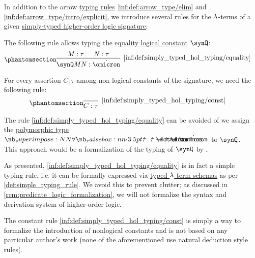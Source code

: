 \begin{definition}\label{def:simply_typed_hol_typing}\mimprovised
  In addition to the arrow \hyperref[con:typing_rule]{typing rules} \ref{inf:def:arrow_type/elim} and \ref{inf:def:arrow_type/intro/explicit}, we introduce several rules for the \( {\mathrm \lambda} \)-terms of a given \hyperref[def:simply_typed_hol_signature]{simply-typed higher-order logic signature}:
  \begin{thmenum}
     The following rule allows typing the \hyperref[def:simply_typed_hol_signature/const]{equality logical constant} \( \synQ \):
    \begin{equation*}\taglabel[\ensuremath{ Q_+ }]{inf:def:simply_typed_hol_typing/equality}
      \begin{prooftree}
        \hypo{ M: \tau }
        \hypo{ N: \tau }
        \infer2[\ref{inf:def:simply_typed_hol_typing/equality}]{ \synQ M N: \syn\omicron }
      \end{prooftree}
    \end{equation*}

     For every assertion \( C: \tau \) among non-logical constants of the signature, we need the following rule:
    \begin{equation*}\taglabel[\ensuremath{ \logic{Ax}_C }]{inf:def:simply_typed_hol_typing/const}
      \begin{prooftree}
        \infer0[\ref{inf:def:simply_typed_hol_typing/const}]{ C: \tau }
      \end{prooftree}
    \end{equation*}
  \end{thmenum}
\end{definition}
\begin{comments}
  \item The rule \ref{inf:def:simply_typed_hol_typing/equality} can be avoided of we assign the \hyperref[def:polymorphic_typed_lambda_calculus]{polymorphic type} \( \qpolytype {\syn\tau} \syn\tau \synimplies \syn\tau \synimplies \syn\omicron \) to \( \synQ \). This approach would be a formalization of the typing of \( \synQ \) by .

  As presented, \ref{inf:def:simply_typed_hol_typing/equality} is in fact a simple typing rule, i.e. it can be formally expressed via \hyperref[def:lambda_term_schema]{typed \( {\mathrm \lambda} \)-term schemas} as per \cref{def:simple_typing_rule}. We avoid this to prevent clutter; as discussed in \cref{rem:predicate_logic_formalization}, we will not formalize the syntax and derivation system of higher-order logic.

  The constant rule \ref{inf:def:simply_typed_hol_typing/const} is simply a way to formalize the introduction of nonlogical constants and is not based on any particular author's work (none of the aforementioned use natural deduction style rules).
\end{comments}

